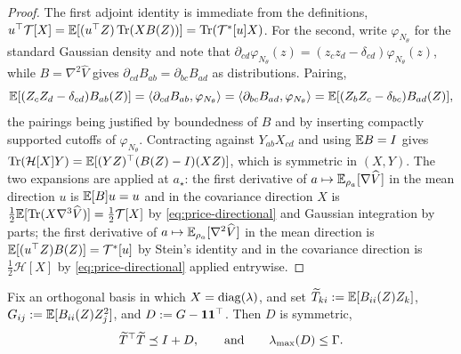 \begin{proof}
The first adjoint identity is immediate from the definitions,
$u^\top\mathcal T[X]=\mathbb{E}[(u^\top Z)\operatorname{Tr}(XB(Z))]=\operatorname{Tr}(\mathcal T^*[u]X)$. For the second, write
$\varphi_{N_\theta}$ for the standard Gaussian density and note that
$\partial_{cd}\varphi_{N_\theta}(z)=(z_cz_d-\delta_{cd})\varphi_{N_\theta}(z)$, while
$B=\nabla^2\widehat V$ gives $\partial_{cd}B_{ab}=\partial_{bc}B_{ad}$ as distributions.
Pairing,
\[
    \mathbb{E}[(Z_cZ_d-\delta_{cd})B_{ab}(Z)]
    =\left\langle \partial_{cd}B_{ab},\varphi_{N_\theta}\right\rangle
    =\left\langle \partial_{bc}B_{ad},\varphi_{N_\theta}\right\rangle
    =\mathbb{E}[(Z_bZ_c-\delta_{bc})B_{ad}(Z)],
\]
the pairings being justified by boundedness of $B$ and by inserting compactly supported cutoffs
of $\varphi_{N_\theta}$. Contracting against $Y_{ab}X_{cd}$ and using $\mathbb{E} B=I$ gives
$\operatorname{Tr}(\mathcal H[X]Y)=\mathbb{E}[(YZ)^\top(B(Z)-I)(XZ)]$, which is symmetric in $(X,Y)$. The two
expansions are  applied at $a_\star$: the first derivative of
$a\mapsto\mathbb{E}_{\rho_a}[\nabla\widehat V]$ in the mean direction $u$ is $\mathbb{E}[B]u=u$ and in the
covariance direction $X$ is $\tfrac12\mathbb{E}[\operatorname{Tr}(X\nabla^3\widehat V)]=\tfrac12\mathcal T[X]$ by
\eqref{eq:price-directional} and Gaussian integration by parts; the first derivative of
$a\mapsto\mathbb{E}_{\rho_a}[\nabla^2\widehat V]$ in the mean direction is
$\mathbb{E}[(u^\top Z)B(Z)]=\mathcal T^*[u]$ by Stein's identity and in the covariance direction is
$\tfrac12\mathcal H[X]$ by \eqref{eq:price-directional} applied entrywise.
\end{proof}

\begin{lemma}
\label{lem:diagonal-modes}
Fix an orthogonal basis in which $X=\operatorname{diag}(\lambda)$, and set
$\widetilde T_{ki}:=\mathbb{E}[B_{ii}(Z)Z_k]$, $G_{ij}:=\mathbb{E}[B_{ii}(Z)Z_j^2]$, and
$D:=G-\mathbf{1}\mathbf{1}^\top$. Then $D$ is symmetric,
\begin{equation}
\label{eq:T-Schur}
    \widetilde T^\top\widetilde T\preceq I+D,
    \qquad\text{and}\qquad
    \lambda_{\max}(D)\leq\Gamma .
\end{equation}
\end{lemma}

